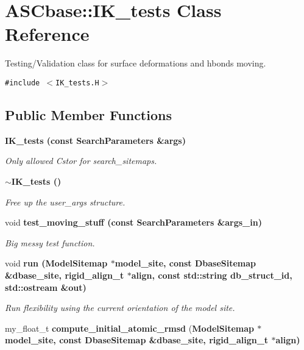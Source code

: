 \section{ASCbase::IK\_\-tests Class Reference}
\label{classASCbase_1_1IK__tests}
Testing/Validation class for surface deformations and hbonds moving.  


{\tt \#include $<$IK\_\-tests.H$>$}

\subsection*{Public Member Functions}
\begin{CompactItemize}
\item 
\bf{IK\_\-tests} (const \bf{Search\-Parameters} \&args)\label{classASCbase_1_1IK__tests_89ac913085506be49f734d9d3fbc5d19}

\begin{CompactList}\small\item\em Only allowed Cstor for search\_\-sitemaps. \item\end{CompactList}\item 
\bf{$\sim$IK\_\-tests} ()\label{classASCbase_1_1IK__tests_280f1a906f3d73ddd2037c2bbbaf0533}

\begin{CompactList}\small\item\em Free up the user\_\-args structure. \item\end{CompactList}\item 
void \bf{test\_\-moving\_\-stuff} (const \bf{Search\-Parameters} \&args\_\-in)
\begin{CompactList}\small\item\em Big messy test function. \item\end{CompactList}\item 
void \bf{run} (\bf{Model\-Sitemap} $\ast$model\_\-site, const \bf{Dbase\-Sitemap} \&dbase\_\-site, \bf{rigid\_\-align\_\-t} $\ast$align, const std::string db\_\-struct\_\-id, std::ostream \&out)
\begin{CompactList}\small\item\em Run flexibility using the current orientation of the model site. \item\end{CompactList}\item 
my\_\-float\_\-t \textbf{compute\_\-initial\_\-atomic\_\-rmsd} (\bf{Model\-Sitemap} $\ast$model\_\-site, const \bf{Dbase\-Sitemap} \&dbase\_\-site, \bf{rigid\_\-align\_\-t} $\ast$align)\label{classASCbase_1_1IK__tests_5748368e2908160b96bcabb654fdcbe6}

\end{CompactItemize}

